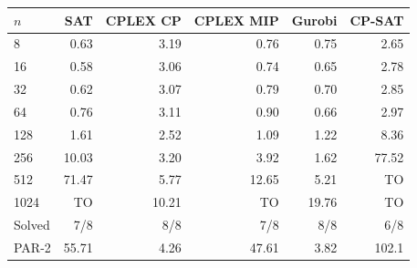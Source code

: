 \begin{tabular}{lrrrrr}
\toprule
$n$ & SAT & CPLEX CP & CPLEX MIP & Gurobi & CP-SAT \\
\midrule
8 & 0.63 & 3.19 & 0.76 & 0.75 & 2.65 \\
16 & 0.58 & 3.06 & 0.74 & 0.65 & 2.78 \\
32 & 0.62 & 3.07 & 0.79 & 0.70 & 2.85 \\
64 & 0.76 & 3.11 & 0.90 & 0.66 & 2.97 \\
128 & 1.61 & 2.52 & 1.09 & 1.22 & 8.36 \\
256 & 10.03 & 3.20 & 3.92 & 1.62 & 77.52 \\
512 & 71.47 & 5.77 & 12.65 & 5.21 & TO \\
1024 & TO & 10.21 & TO & 19.76 & TO \\
Solved & 7/8 & 8/8 & 7/8 & 8/8 & 6/8 \\
PAR-2 & 55.71 & 4.26 & 47.61 & 3.82 & 102.1 \\
\bottomrule
\end{tabular}
